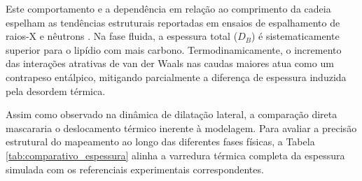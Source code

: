 Este comportamento e a dependência em relação ao comprimento da cadeia espelham as tendências estruturais reportadas em ensaios de espalhamento de raios-X e nêutrons \cite{kucerka2011}. Na fase fluida, a espessura total ($D_B$) é sistematicamente superior para o lipídio com mais carbono. Termodinamicamente, o incremento das interações atrativas de van der Waals nas caudas maiores atua como um contrapeso entálpico, mitigando parcialmente a diferença de espessura induzida pela desordem térmica.

Assim como observado na dinâmica de dilatação lateral, a comparação direta mascararia o deslocamento térmico inerente à modelagem. Para avaliar a precisão estrutural do mapeamento ao longo das diferentes fases físicas, a Tabela \ref{tab:comparativo_espessura} alinha a varredura térmica completa da espessura simulada com os referenciais experimentais correspondentes.

